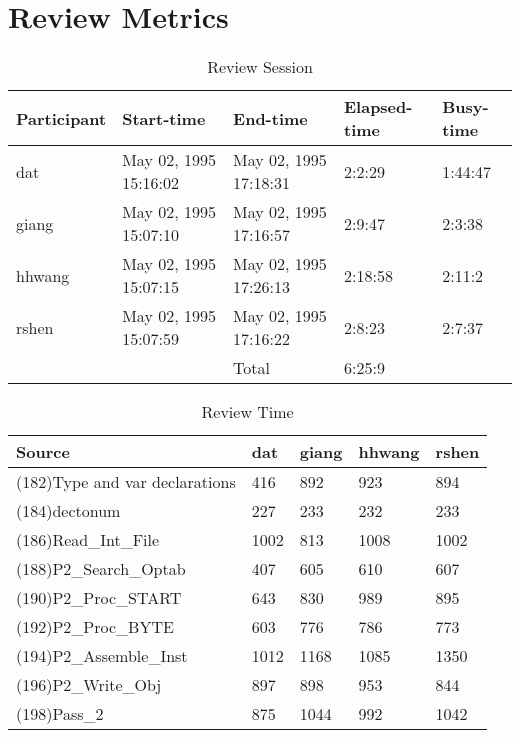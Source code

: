\section{Review Metrics}
\begin{table}[hb]
\begin{center}
\begin{tabular}{|l|l|l|l|l|}
\hline
Participant & Start-time & End-time & Elapsed-time & Busy-time \\
\hline
dat & May 02, 1995 15:16:02 & May 02, 1995 17:18:31 & 2:2:29 & 1:44:47 \\
giang & May 02, 1995 15:07:10 & May 02, 1995 17:16:57 & 2:9:47 & 2:3:38 \\
hhwang & May 02, 1995 15:07:15 & May 02, 1995 17:26:13 & 2:18:58 & 2:11:2 \\
rshen & May 02, 1995 15:07:59 & May 02, 1995 17:16:22 & 2:8:23 & 2:7:37 \\
\hline
 & & Total & 6:25:9 & \\
\hline
\end{tabular}
\end{center}
\caption{Review Session}
\end{table}


\begin{table}[hb]
\begin{center}
\begin{tabular}{|l|l|l|l|l|}
\hline
Source & dat & giang & hhwang & rshen\\
\hline
(182)Type and var declarations & 416 & 892 & 923 & 894\\
(184)dectonum & 227 & 233 & 232 & 233\\
(186)Read\_Int\_File & 1002 & 813 & 1008 & 1002\\
(188)P2\_Search\_Optab & 407 & 605 & 610 & 607\\
(190)P2\_Proc\_START & 643 & 830 & 989 & 895\\
(192)P2\_Proc\_BYTE & 603 & 776 & 786 & 773\\
(194)P2\_Assemble\_Inst & 1012 & 1168 & 1085 & 1350\\
(196)P2\_Write\_Obj & 897 & 898 & 953 & 844\\
(198)Pass\_2 & 875 & 1044 & 992 & 1042\\
\hline
\end{tabular}
\end{center}
\caption{Review Time}
\end{table}

